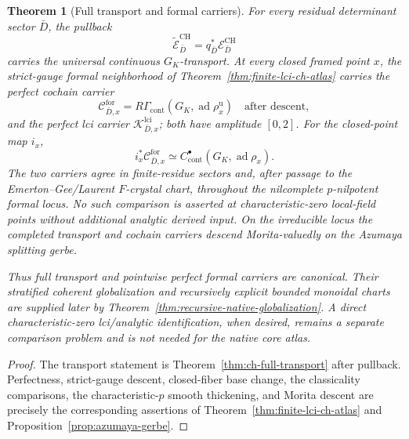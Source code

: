 \documentclass[11pt]{article}
\newtheorem{theorem}{Theorem}[section]
\theoremstyle{definition}
\begin{document}
\begin{theorem}[Full transport and formal carriers]\label{thm:canonical-derived-finite-atlas}
For every residual determinant sector $\bar D$, the pullback
\[
\widetilde{\mathcal E}^{\mathrm{CH}}_{\bar D}
=q_{\bar D}^{*}\mathcal E^{\mathrm{CH}}_{\bar D}
\]
carries the universal continuous $G_K$-transport.  At every closed framed point $x$, the strict-gauge formal neighborhood of Theorem~\ref{thm:finite-lci-ch-atlas} carries the perfect cochain carrier
\begin{equation}\label{eq:canonical-derived-carrier}
\mathcal C^{\mathrm{for}}_{\bar D,x}
=R\Gamma_{\mathrm{cont}}(G_K,\operatorname{ad}\rho_x^{\mathrm u})
\quad\text{after descent},
\end{equation}
and the perfect lci carrier $\mathcal K^{\mathrm{lci}}_{\bar D,x}$; both have amplitude $[0,2]$.
For the closed-point map $i_x$,
\begin{equation}\label{eq:canonical-carrier-closed-fiber}
i_x^{*}\mathcal C^{\mathrm{for}}_{\bar D,x}
\simeq C^\bullet_{\mathrm{cont}}(G_K,\operatorname{ad}\rho_x).
\end{equation}
The two carriers agree in finite-residue sectors and, after passage to the Emerton--Gee/Laurent $F$-crystal chart, throughout the nilcomplete $p$-nilpotent formal locus.  No such comparison is asserted at characteristic-zero local-field points without additional analytic derived input.  On the irreducible locus the completed transport and cochain carriers descend Morita-valuedly on the Azumaya splitting gerbe.

Thus full transport and pointwise perfect formal carriers are canonical.  Their stratified coherent globalization and recursively explicit bounded monoidal charts are supplied later by Theorem~\ref{thm:recursive-native-globalization}.  A direct characteristic-zero lci/analytic identification, when desired, remains a separate comparison problem and is not needed for the native core atlas.
\end{theorem}

\begin{proof}
The transport statement is Theorem~\ref{thm:ch-full-transport} after pullback.  Perfectness, strict-gauge descent, closed-fiber base change, the classicality comparisons, the characteristic-$p$ smooth thickening, and Morita descent are precisely the corresponding assertions of Theorem~\ref{thm:finite-lci-ch-atlas} and Proposition~\ref{prop:azumaya-gerbe}.
\end{proof}
\end{document}
